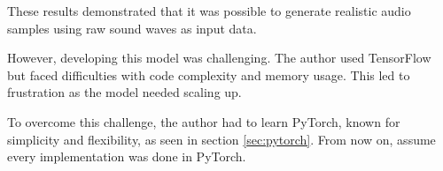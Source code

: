 These results demonstrated that it was possible to generate realistic audio samples using raw sound waves as input data.

However, developing this model was challenging. The author used TensorFlow but faced difficulties with code complexity and memory usage. This led to frustration as the model needed scaling up.

To overcome this challenge, the author had to learn PyTorch, known for simplicity and flexibility, as seen in section \ref{sec:pytorch}. From now on, assume every implementation was done in PyTorch.